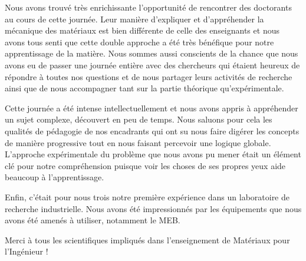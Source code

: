 Nous avons trouvé très enrichissante l'opportunité de rencontrer des doctorants au cours de cette journée.
Leur manière d'expliquer et d'appréhender la mécanique des matériaux est bien différente de celle des 
enseignants et nous avons tous senti que cette double approche a été très bénéfique pour notre apprentissage 
de la matière. Nous sommes aussi conscients de la chance que nous avons eu de passer une journée entière avec 
des chercheurs qui étaient heureux de répondre à toutes nos questions et de nous partager leurs activités de 
recherche ainsi que de nous accompagner tant sur la partie théorique qu'expérimentale. 

Cette journée a été intense intellectuellement et nous avons appris à appréhender un sujet complexe, 
découvert en peu de temps. Nous saluons pour cela les qualités de pédagogie de nos encadrants qui 
ont su nous faire digérer les concepts de manière progressive tout en nous faisant percevoir une 
logique globale. L'approche expérimentale du problème que nous avons pu mener était un élément clé pour notre compréhension puisque voir les choses de ses propres yeux aide beaucoup à l'apprentissage.

Enfin, c'était pour nous trois notre première expérience dans un laboratoire de recherche 
industrielle. Nous avons été impressionnés par les équipements que nous avons été amenés à utiliser, notamment le MEB. 

Merci à tous les scientifiques impliqués dans l'enseignement de Matériaux pour l'Ingénieur !